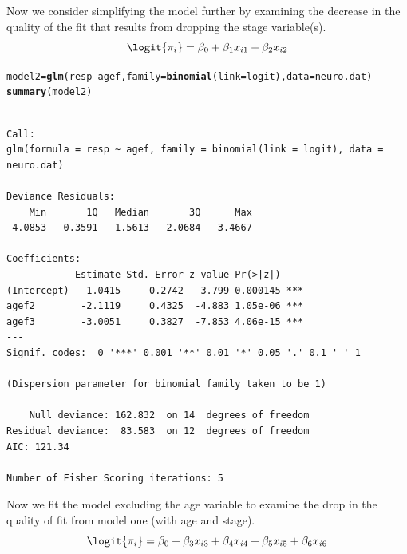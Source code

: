 \documentclass[oneside]{book}\usepackage[]{graphicx}\usepackage[svgnames]{xcolor}
\makeatletter
\newcommand{\hlopt}[1]{\textcolor[rgb]{0,0,0}{#1}}%
\newcommand{\hlstd}[1]{\textcolor[rgb]{0.345,0.345,0.345}{#1}}%
\newcommand{\hlkwb}[1]{\textcolor[rgb]{0.69,0.353,0.396}{#1}}%
\newcommand{\hlkwc}[1]{\textcolor[rgb]{0.333,0.667,0.333}{#1}}%
\newcommand{\hlkwd}[1]{\textcolor[rgb]{0.737,0.353,0.396}{\textbf{#1}}}%
\newenvironment{kframe}{%
 \def\at@end@of@kframe{}%
 \ifinner\ifhmode%
  \def\at@end@of@kframe{\end{minipage}}%
  \begin{minipage}{\columnwidth}%
 \fi\fi%
 \def\FrameCommand##1{\hskip\@totalleftmargin \hskip-\fboxsep
 \colorbox{shadecolor}{##1}\hskip-\fboxsep
     \hskip-\linewidth \hskip-\@totalleftmargin \hskip\columnwidth}%
 \MakeFramed {\advance\hsize-\width
   \@totalleftmargin\z@ \linewidth\hsize
   \@setminipage}}%
 {\par\unskip\endMakeFramed%
 \at@end@of@kframe}
\newenvironment{knitrout}{}{} %
\makeatother
\begin{document}
Now we consider simplifying the model further by examining the decrease in the quality
of the fit that results from dropping the stage variable(s).
\[ \logit{\pi_i}=\beta_0+\beta_1x_{i1}+\beta_2x_{i2} \]
\begin{knitrout}
\color{fgcolor}\begin{kframe}
\begin{alltt}
\hlstd{model2} \hlkwb{=} \hlkwd{glm}\hlstd{(resp} \hlopt{~} \hlstd{agef,} \hlkwc{family} \hlstd{=} \hlkwd{binomial}\hlstd{(}\hlkwc{link} \hlstd{= logit),} \hlkwc{data} \hlstd{= neuro.dat)}
\hlkwd{summary}\hlstd{(model2)}
\end{alltt}
\begin{verbatim}

Call:
glm(formula = resp ~ agef, family = binomial(link = logit), data = neuro.dat)

Deviance Residuals: 
    Min       1Q   Median       3Q      Max  
-4.0853  -0.3591   1.5613   2.0684   3.4667  

Coefficients:
            Estimate Std. Error z value Pr(>|z|)    
(Intercept)   1.0415     0.2742   3.799 0.000145 ***
agef2        -2.1119     0.4325  -4.883 1.05e-06 ***
agef3        -3.0051     0.3827  -7.853 4.06e-15 ***
---
Signif. codes:  0 '***' 0.001 '**' 0.01 '*' 0.05 '.' 0.1 ' ' 1

(Dispersion parameter for binomial family taken to be 1)

    Null deviance: 162.832  on 14  degrees of freedom
Residual deviance:  83.583  on 12  degrees of freedom
AIC: 121.34

Number of Fisher Scoring iterations: 5
\end{verbatim}
\end{kframe}
\end{knitrout}
Now we fit the model excluding the age variable to examine the drop in the quality of
fit from model one (with age and stage).
\[ \logit{\pi_i}=\beta_0+\beta_3x_{i3}+\beta_4x_{i4}+\beta_5x_{i5}+\beta_6x_{i6} \]
\end{document}
